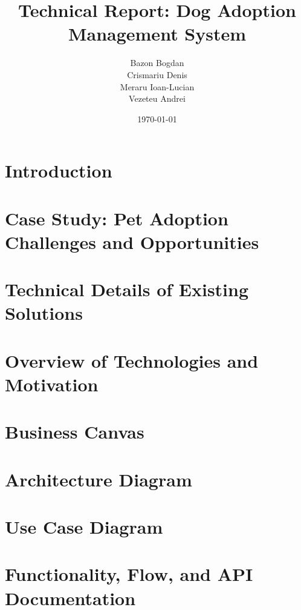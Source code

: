 \documentclass[12pt,a4paper]{report}
\title{Technical Report: Dog Adoption Management System}
\author{Bazon Bogdan \\ Crismariu Denis \\ Meraru Ioan-Lucian \\ Vezeteu Andrei}
\date{\today}
\begin{document}
\maketitle

\tableofcontents

\chapter{Introduction}


\chapter{Case Study: Pet Adoption Challenges and Opportunities}


\chapter{Technical Details of Existing Solutions}


\chapter{Overview of Technologies and Motivation}


\chapter{Business Canvas}


\chapter{Architecture Diagram}


\chapter{Use Case Diagram}


\chapter{Functionality, Flow, and API Documentation}




\end{document}
